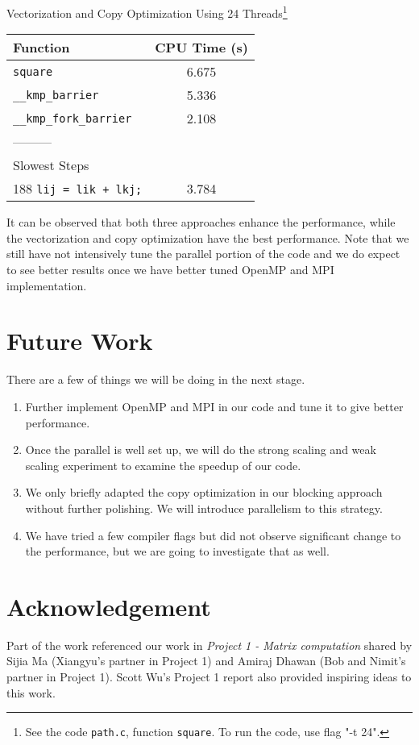 \documentclass[12pt]{article}
\begin{document}
\bigskip
\begin{center}
	Vectorization and Copy Optimization Using 24 Threads\footnote{See the code \texttt{path.c}, function \texttt{square}. To run the code, use flag "-t 24".}
	\begin{tabular}{l|c}
		Function & CPU Time (s) \\ \hline
		\texttt{square} & 6.675 \\
        \texttt{\_\_kmp\_barrier} & 5.336 \\
        \texttt{\_\_kmp\_fork\_barrier} & 2.108 \\
		--------- \\       
		Slowest Steps \\
        188 \texttt{lij = lik + lkj;} & 3.784
	\end{tabular}
\end{center}
It can be observed that both three approaches enhance the performance, while the vectorization and copy optimization have the best performance. Note that we still have not intensively tune the parallel portion of the code and we do expect to see better results once we have better tuned OpenMP and MPI implementation.
\section{Future Work}
There are a few of things we will be doing in the next stage.
	\begin{enumerate}
    	\item Further implement OpenMP and MPI in our code and tune it to give better performance.
        \item Once the parallel is well set up, we will do the strong scaling and weak scaling experiment to examine the speedup of our code.
        \item We only briefly adapted the copy optimization in our blocking approach without further polishing. We will introduce parallelism to this strategy.
        \item We have tried a few compiler flags but did not observe significant change to the performance, but we are going to investigate that as well.
   \end{enumerate}

\section{Acknowledgement}
Part of the work referenced our work in \textit{Project 1 - Matrix computation} shared by Sijia Ma (Xiangyu's partner in Project 1) and Amiraj Dhawan (Bob and Nimit's partner in Project 1). Scott Wu's Project 1 report also provided inspiring ideas to this work.
\end{document}
